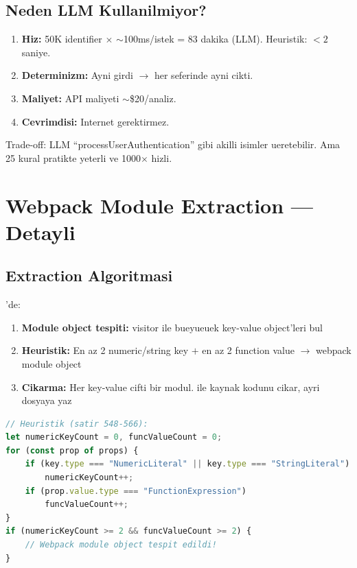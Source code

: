 \subsection{Neden LLM Kullanilmiyor?}

\begin{enumerate}
\item \textbf{Hiz:} 50K identifier $\times$ $\sim$100ms/istek = 83 dakika (LLM). Heuristik: $< 2$ saniye.
\item \textbf{Determinizm:} Ayni girdi $\to$ her seferinde ayni cikti.
\item \textbf{Maliyet:} API maliyeti $\sim$\$20/analiz.
\item \textbf{Cevrimdisi:} Internet gerektirmez.
\end{enumerate}

Trade-off: LLM ``processUserAuthentication'' gibi akilli isimler ueretebilir. Ama 25 kural pratikte yeterli ve 1000$\times$ hizli.


\section{Webpack Module Extraction --- Detayli}
\label{sec:webpack-deep}

\subsection{Extraction Algoritmasi}

'de:

\begin{enumerate}
\item \textbf{Module object tespiti:}  visitor ile bueyueuek key-value object'leri bul
\item \textbf{Heuristik:} En az 2 numeric/string key $+$ en az 2 function value $\to$ webpack module object
\item \textbf{Cikarma:} Her key-value cifti bir modul.  ile kaynak kodunu cikar, ayri dosyaya yaz
\end{enumerate}

\begin{lstlisting}[language=JavaScript]
// Heuristik (satir 548-566):
let numericKeyCount = 0, funcValueCount = 0;
for (const prop of props) {
    if (key.type === "NumericLiteral" || key.type === "StringLiteral")
        numericKeyCount++;
    if (prop.value.type === "FunctionExpression")
        funcValueCount++;
}
if (numericKeyCount >= 2 && funcValueCount >= 2) {
    // Webpack module object tespit edildi!
}
\end{lstlisting}

